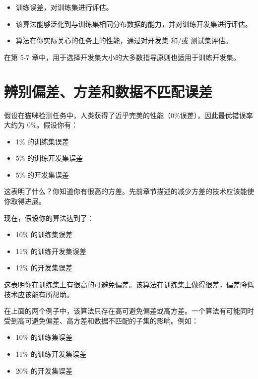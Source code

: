\begin{itemize}
\tightlist
\item
  训练误差，对训练集进行评估。
\item
  该算法能够泛化到与训练集相同分布数据的能力，并对训练开发集进行评估。
\item
  算法在你实际关心的任务上的性能，通过对开发集 和/或 测试集评估。
\end{itemize}

在第 5-7 章中，用于选择开发集大小的大多数指导原则也适用于训练开发集。

\hypertarget{ux8fa8ux522bux504fux5deeux65b9ux5deeux548cux6570ux636eux4e0dux5339ux914dux8befux5dee}{%
\chapter{辨别偏差、方差和数据不匹配误差}\label{ux8fa8ux522bux504fux5deeux65b9ux5deeux548cux6570ux636eux4e0dux5339ux914dux8befux5dee}}

假设在猫咪检测任务中，人类获得了近乎完美的性能（0\%误差），因此最优错误率大约为
0\%。假设你有：

\begin{itemize}
\tightlist
\item
  1\% 的训练集误差
\item
  5\% 的训练开发集误差
\item
  5\% 的开发集误差
\end{itemize}

这表明了什么？你知道你有很高的方差。先前章节描述的减少方差的技术应该能使你取得进展。

现在，假设你的算法达到了：

\begin{itemize}
\tightlist
\item
  10\% 的训练集误差
\item
  11\% 的训练开发集误差
\item
  12\% 的开发集误差
\end{itemize}

这表明你在训练集上有很高的可避免偏差。该算法在训练集上做得很差，偏差降低技术应该能有所帮助。

在上面的两个例子中，该算法只存在高可避免偏差或高方差。一个算法有可能同时受到高可避免偏差、高方差和数据不匹配的子集的影响。例如：

\begin{itemize}
\tightlist
\item
  10\% 的训练集误差
\item
  11\% 的训练开发集误差
\item
  20\% 的开发集误差
\end{itemize}

